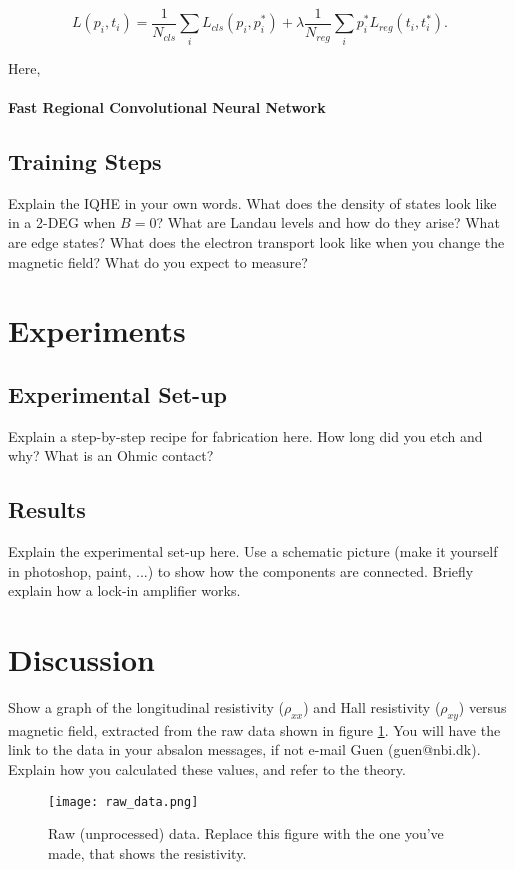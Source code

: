 \documentclass[a4paper]{article}
\begin{document}
$$L({p_i},{t_i}) = \frac{1}{N_{cls}} \sum_i L_{cls} (p_i,p_i^*) + \lambda \frac{1}{N_{reg}} \sum_i p_i^* L_{reg} (t_i,t_i^*).$$

\noindent Here, 

\paragraph{Fast Regional Convolutional Neural Network}

\subsection{Training Steps}
Explain the IQHE in your own words. What does the density of states look like in a 2-DEG when $B=0$? What are Landau levels and how do they arise? What are edge states? What does the electron transport look like when you change the magnetic field? What do you expect to measure?

\section{Experiments}

\subsection{Experimental Set-up}
Explain a step-by-step recipe for fabrication here. How long did you etch and why? What is an Ohmic contact?

\subsection{Results}
Explain the experimental set-up here. Use a schematic picture (make it yourself in photoshop, paint, ...) to show how the components are connected. Briefly explain how a lock-in amplifier works.

\section{Discussion}

Show a graph of the longitudinal resistivity ($\rho_{xx}$) and Hall resistivity ($\rho_{xy}$) versus magnetic field, extracted from the raw data shown in figure \ref{fig:data}. You will have the link to the data in your absalon messages, if not e-mail Guen (guen@nbi.dk). Explain how you calculated these values, and refer to the theory.

\begin{figure}
\centering
\texttt{[image: raw\_data.png]}
\caption{\label{fig:data}Raw (unprocessed) data. Replace this figure with the one you've made, that shows the resistivity.}
\end{figure}
\end{document}
